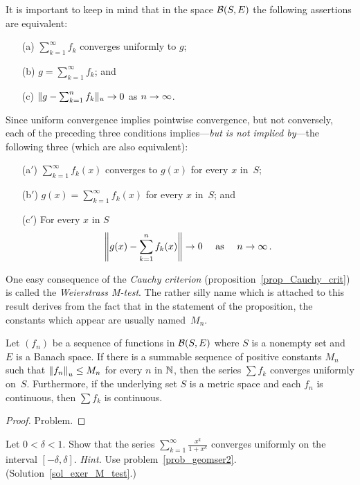 It is important to keep in mind that in the space $\mathcal{B}(S,E)$ the following assertions are
equivalent:
 \begin{enumerate}
   \item[(a)] $\sum_{k=1}^\infty f_k$ converges uniformly to $g$;
   \item[(b)] $g = \sum_{k=1}^\infty f_k$; and
   \item[(c)] $\lVert g - \sum_{k=1}^n f_k\rVert_u \rightarrow 0$ as $n \rightarrow
\infty$.
 \end{enumerate}
Since uniform convergence implies pointwise convergence, but not conversely, each of the
preceding three conditions implies---\emph{but is not implied by}---the following three (which
are also equivalent):
 \begin{enumerate}
   \item[(a${}'$)] $\sum_{k=1}^\infty f_k(x)$ converges to $g(x)$ for every $x$ in~$S$;
   \item[(b${}'$)] $g(x) = \sum_{k=1}^\infty f_k(x)$ for every $x$ in~$S$; and
   \item[(c${}'$)] For every $x$ in $S$
       \[ \left\lVert g(x) - \sum_{k=1}^n f_k(x)\right\rVert \rightarrow 0 \quad \text{ as } \quad  n \rightarrow \infty\,. \]
 \end{enumerate}


One easy consequence of the \emph{Cauchy criterion} (proposition~\ref{prop_Cauchy_crit}) is
called the \emph{Weierstrass M-test}.  The rather silly name which is attached to this result
derives from the fact that in the statement of the proposition, the constants which appear are
usually named~$M_n$.


\begin{prop}\label{M_test}
Let $(f_n)$ be a sequence of functions in $\mathcal{B}(S,E)$ where $S$ is a nonempty set and $E$ is
a Banach space.  If there is a summable sequence of positive constants $M_n$ such that
$\left\lVert f_n\right\rVert_u \le M_n$ for every $n$ in $\mathbb{N}$, then the series $\sum f_k$ converges
uniformly on~$S$.  Furthermore, if the underlying set $S$ is a metric space and each $f_n$ is
continuous, then $\sum f_k$ is continuous.
\end{prop}

\begin{proof} Problem.  \ns  \end{proof}

\begin{exer}\label{exer_M_test}  Let $0 < \delta < 1$.  Show that the series
$\sum_{k=1}^\infty \frac{x^k}{1+x^k}$ converges uniformly on the interval $[-\delta,\delta]$.
\emph{Hint.}  Use problem~\ref{prob_geomser2}.  (Solution~\ref{sol_exer_M_test}.)
\end{exer}

